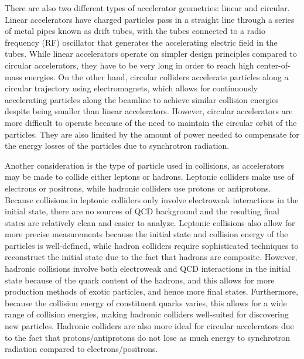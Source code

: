 There are also two different types of accelerator geometries: linear and circular.
Linear accelerators have charged particles pass in a straight line through a series of metal pipes known as drift tubes, with the tubes connected to a radio frequency (RF) oscillator that generates the accelerating electric field in the tubes.
While linear accelerators operate on simpler design principles compared to circular accelerators, they have to be very long in order to reach high center-of-mass energies.
On the other hand, circular colliders accelerate particles along a circular trajectory using electromagnets, which allows for continuously accelerating particles along the beamline to achieve similar collision energies despite being smaller than linear accelerators.
However, circular accelerators are more difficult to operate because of the need to maintain the circular orbit of the particles.
They are also limited by the amount of power needed to compensate for the energy losses of the particles due to synchrotron radiation.

Another consideration is the type of particle used in collisions, as accelerators may be made to collide either leptons or hadrons.
Leptonic colliders make use of electrons or positrons, while hadronic colliders use protons or antiprotons.
Because collisions in leptonic colliders only involve electroweak interactions in the initial state, there are no sources of QCD background and the resulting final states are relatively clean and easier to analyze.
Leptonic collisions also allow for more precise measurements because the initial state and collision energy of the particles is well-defined, while hadron colliders require sophisticated techniques to reconstruct the initial state due to the fact that hadrons are composite.
However, hadronic collisions involve both electroweak and QCD interactions in the initial state because of the quark content of the hadrons, and this allows for more production methods of exotic particles, and hence more final states.
Furthermore, because the collision energy of constituent quarks varies, this allows for a wide range of collision energies, making hadronic colliders well-suited for discovering new particles.
Hadronic colliders are also more ideal for circular accelerators due to the fact that protons/antiprotons do not lose as much energy to synchrotron radiation compared to electrons/positrons.

